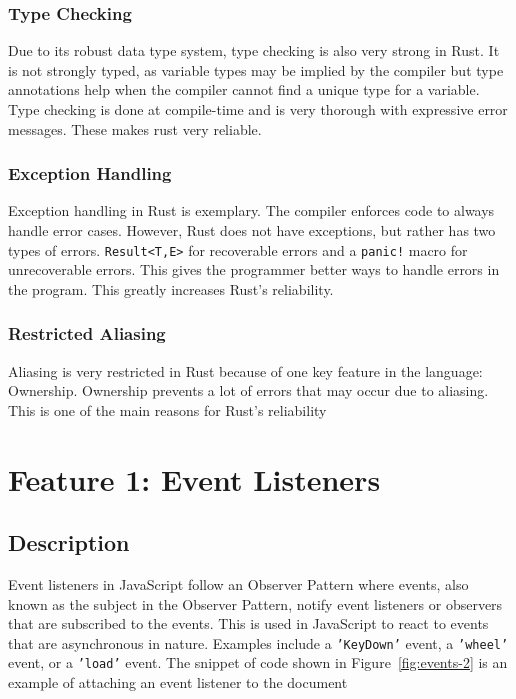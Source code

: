 \documentclass{article}
\newcommand{\jsin}[1]{\texttt{#1}}
\newcommand{\rustin}[1]{\texttt{#1}}
\begin{document}
  \subsubsection{Type Checking}
  Due to its robust data type system, type checking is also very strong in Rust.
  It is not strongly typed, as variable types may be implied by the compiler but
  type annotations help when the compiler cannot find a unique type for a
  variable. Type checking is done at compile-time and is very thorough with
  expressive error messages. These makes rust very reliable.

  \subsubsection{Exception Handling}
  Exception handling in Rust is exemplary. The compiler enforces code to always
  handle error cases. However, Rust does not have exceptions, but rather has two
  types of errors. \rustin{Result<T,E>} for recoverable errors and a
  \rustin{panic!} macro for unrecoverable errors. This gives the programmer
  better ways to handle errors in the program. This greatly increases Rust's
  reliability.

  \subsubsection{Restricted Aliasing}
  Aliasing is very restricted in Rust because of one key feature in the
  language: Ownership. Ownership prevents a lot of errors that may occur due to
  aliasing. This is one of the main reasons for Rust's reliability

  \section{Feature 1: Event Listeners}
  \subsection{Description}
  Event listeners in JavaScript follow an Observer Pattern where events, also
  known as the subject in the Observer Pattern, notify event listeners or
  observers that are subscribed to the events. This is used in JavaScript to
  react to events that are asynchronous in nature. Examples include a
  \jsin{'KeyDown'} event, a \jsin{'wheel'} event, or a \jsin{'load'} event. The
  snippet of code shown in Figure~\ref{fig:events-2} is an example of attaching
  an event listener to the document
\end{document}
